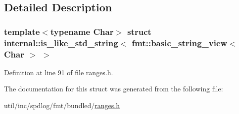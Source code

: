 \subsection{Detailed Description}
\subsubsection*{template$<$typename Char$>$\newline
struct internal\+::is\+\_\+like\+\_\+std\+\_\+string$<$ fmt\+::basic\+\_\+string\+\_\+view$<$ Char $>$ $>$}



Definition at line 91 of file ranges.\+h.



The documentation for this struct was generated from the following file\+:\begin{DoxyCompactItemize}
\item 
util/inc/spdlog/fmt/bundled/\hyperlink{ranges_8h}{ranges.\+h}\end{DoxyCompactItemize}
